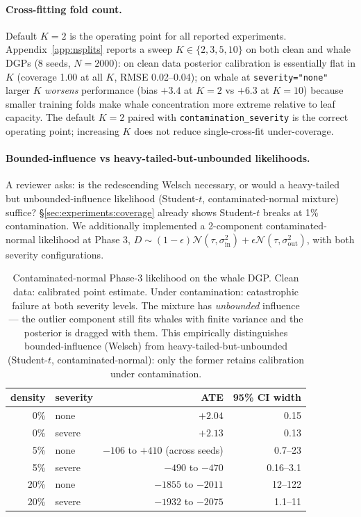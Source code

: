 \paragraph{Cross-fitting fold count.}
Default $K = 2$ is the operating point for all reported experiments.
Appendix~\ref{app:nsplits} reports a sweep $K \in \{2, 3, 5, 10\}$
on both clean and whale DGPs (8 seeds, $N = 2000$): on clean data
posterior calibration is essentially flat in $K$ (coverage 1.00 at
all $K$, RMSE 0.02--0.04); on whale at \texttt{severity="none"}
larger $K$ \emph{worsens} performance (bias $+3.4$ at $K=2$ vs $+6.3$
at $K=10$) because smaller training folds make whale concentration
more extreme relative to leaf capacity. The default $K=2$ paired
with \texttt{contamination\_severity} is the correct operating
point; increasing $K$ does not reduce single-cross-fit
under-coverage.

\paragraph{Bounded-influence vs heavy-tailed-but-unbounded likelihoods.}
A reviewer asks: is the redescending Welsch necessary, or would
a heavy-tailed but unbounded-influence likelihood (Student-$t$,
contaminated-normal mixture) suffice? \S\ref{sec:experiments:coverage}
already shows Student-$t$ breaks at 1\% contamination. We
additionally implemented a 2-component contaminated-normal
likelihood at Phase 3, $D \sim (1-\epsilon)\mathcal{N}(\tau, \sigma_{\text{in}}^2) +
\epsilon \mathcal{N}(\tau, \sigma_{\text{out}}^2)$, with both severity
configurations.

\begin{table}[!t]
\centering
\small
\begin{tabular}{rlrr}
\toprule
density & severity & ATE & 95\% CI width \\
\midrule
0\%   & none    & $+2.04$    & 0.15 \\
0\%   & severe  & $+2.13$    & 0.13 \\
5\%   & none    & $-106$ to $+410$ (across seeds) & 0.7--23 \\
5\%   & severe  & $-490$ to $-470$               & 0.16--3.1 \\
20\%  & none    & $-1855$ to $-2011$             & 12--122 \\
20\%  & severe  & $-1932$ to $-2075$             & 1.1--11 \\
\bottomrule
\end{tabular}
\caption{Contaminated-normal Phase-3 likelihood on the whale DGP.
Clean data: calibrated point estimate. Under contamination:
catastrophic failure at both severity levels. The mixture has
\emph{unbounded} influence --- the outlier component still fits whales
with finite variance and the posterior is dragged with them. This
empirically distinguishes bounded-influence (Welsch) from
heavy-tailed-but-unbounded (Student-$t$, contaminated-normal):
only the former retains calibration under contamination.}
\label{tab:contam_normal}
\end{table}

